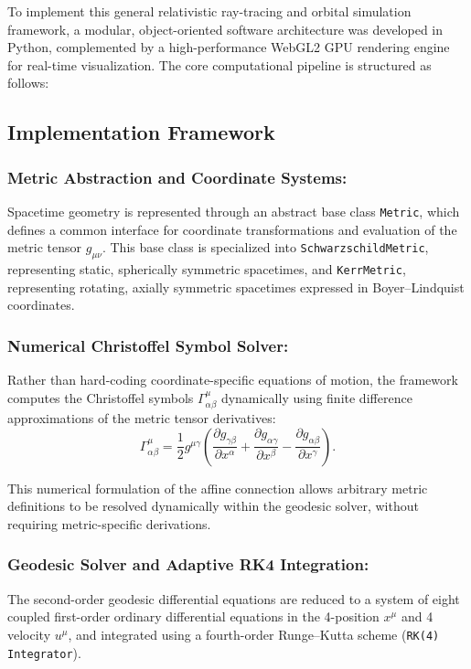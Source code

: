 \documentclass[12pt]{article}
\begin{document}
\begin{itemize}
To implement this general relativistic ray-tracing and orbital simulation framework, a modular, object-oriented software architecture was developed in Python, complemented by a high-performance WebGL2 GPU rendering engine for real-time visualization. The core computational pipeline is structured as follows:

\subsection{Implementation Framework}

\subsubsection{\textbf{Metric Abstraction and Coordinate Systems:}}
Spacetime geometry is represented through an abstract base class \texttt{Metric}, which defines a common interface for coordinate transformations and evaluation of the 
metric tensor $g_{\mu\nu}$. This base class is specialized into \small\texttt{SchwarzschildMetric}, representing static, spherically symmetric spacetimes, and 
\small\texttt{KerrMetric}, representing rotating, axially symmetric spacetimes expressed in Boyer--Lindquist coordinates.
\medskip

\subsubsection{\textbf{Numerical Christoffel Symbol Solver:}}
Rather than hard-coding coordinate-specific equations of motion, the framework computes the Christoffel symbols $\Gamma^{\mu}_{\alpha\beta}$ dynamically using finite difference approximations of the metric tensor derivatives:
\begin{equation}
\Gamma^{\mu}_{\alpha\beta}
=
\frac{1}{2}g^{\mu\gamma}
\left(
\frac{\partial g_{\gamma\beta}}{\partial x^\alpha}
+
\frac{\partial g_{\alpha\gamma}}{\partial x^\beta}
-
\frac{\partial g_{\alpha\beta}}{\partial x^\gamma}
\right).
\end{equation}

This numerical formulation of the affine connection allows arbitrary metric definitions to be resolved dynamically within the geodesic solver, without requiring metric-specific derivations.

\medskip

\subsubsection{\textbf{Geodesic Solver and Adaptive RK4 Integration:}}
The second-order geodesic differential equations are reduced to a system of eight coupled first-order ordinary differential equations in the 4-position $x^\mu$ and 4 velocity $u^\mu$, and integrated using a fourth-order Runge--Kutta scheme (\texttt{RK(4) Integrator}).


\end{itemize}
\end{document}
